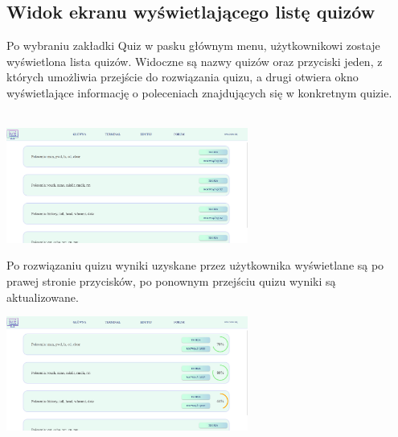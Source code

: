 \documentclass[10pt,a4paper]{report}
\begin{document}
\begin{adjustwidth}{2cm}{2cm}
\subsection{Widok ekranu wyświetlającego listę quizów}
\begin{minipage}{1\linewidth}
Po wybraniu zakładki Quiz  w pasku głównym menu, użytkownikowi zostaje wyświetlona lista quizów.
Widoczne są nazwy quizów oraz przyciski jeden, z których umożliwia przejście do rozwiązania quizu, a drugi otwiera okno wyświetlające informację o poleceniach znajdujących się w konkretnym quizie.\\  \\
\end{minipage}
\begin{minipage}{\linewidth}
\begin{center}
  \includegraphics[width=300px]{project/list_quiz.png}
\end{center}
\end{minipage}
\begin{minipage}{1\linewidth}
\vspace{0.3cm}
 Po rozwiązaniu quizu wyniki uzyskane przez użytkownika wyświetlane są po prawej stronie przycisków, po ponownym przejściu quizu wyniki są aktualizowane. \\ 
\end{minipage}
\begin{minipage}{\linewidth}
\begin{center}
  \includegraphics[width=300px]{project/list_quiz2.png}
\end{center}
\end{minipage}

\end{adjustwidth}
\end{document}
